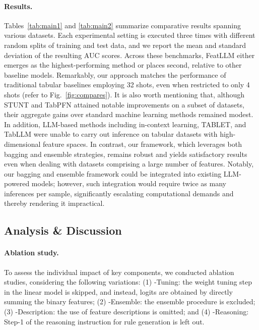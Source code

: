 \vspace*{-0.12in}
\paragraph{Results.}
Tables~\ref{tab:main1} and \ref{tab:main2} summarize comparative results spanning various datasets. Each experimental setting is executed three times with different random splits of training and test data, and we report the mean and standard deviation of the resulting AUC scores. Across these benchmarks, \textsf{FeatLLM} either emerges as the highest-performing method or places second, relative to other baseline models. Remarkably, our approach matches the performance of traditional tabular baselines employing 32 shots, even when restricted to only 4 shots (refer to Fig.~\ref{fig:compares}). It is also worth mentioning that, although STUNT and TabPFN attained notable improvements on a subset of datasets, their aggregate gains over standard machine learning methods remained modest. In addition, LLM-based methods including in-context learning, TABLET, and TabLLM were unable to carry out inference on tabular datasets with high-dimensional feature spaces. In contrast, our framework, which leverages both bagging and ensemble strategies, remains robust and yields satisfactory results even when dealing with datasets comprising a large number of features. Notably, our bagging and ensemble framework could be integrated into existing LLM-powered models; however, such integration would require twice as many inferences per sample, significantly escalating computational demands and thereby rendering it impractical.

\subsection{Analysis \& Discussion}
\label{sec:analysis}
\paragraph{Ablation study.} To assess the individual impact of key components, we conducted ablation studies, considering the following variations: (1) \textsf{-Tuning}: the weight tuning step in the linear model is skipped, and instead, logits are obtained by directly summing the binary features; (2) \textsf{-Ensemble}: the ensemble procedure is excluded; (3) \textsf{-Description}: the use of feature descriptions is omitted; and (4) \textsf{-Reasoning}: Step-1 of the reasoning instruction for rule generation is left out.

